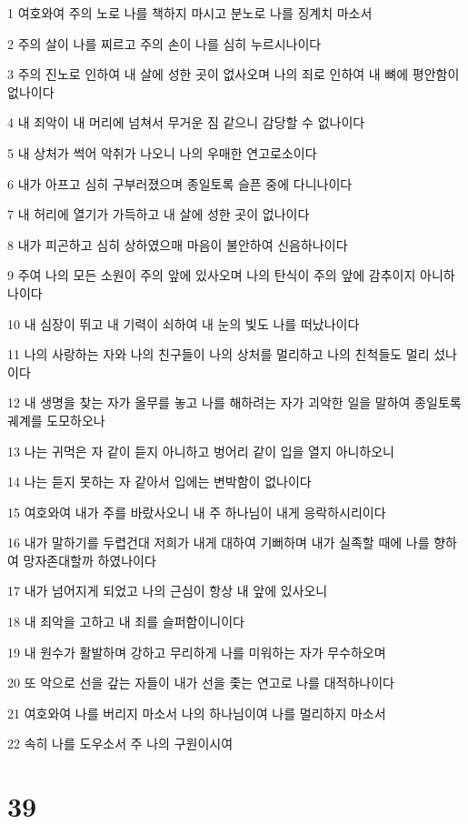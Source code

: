 \par 1 여호와여 주의 노로 나를 책하지 마시고 분노로 나를 징계치 마소서
\par 2 주의 살이 나를 찌르고 주의 손이 나를 심히 누르시나이다
\par 3 주의 진노로 인하여 내 살에 성한 곳이 없사오며 나의 죄로 인하여 내 뼈에 평안함이 없나이다
\par 4 내 죄악이 내 머리에 넘쳐서 무거운 짐 같으니 감당할 수 없나이다
\par 5 내 상처가 썩어 악취가 나오니 나의 우매한 연고로소이다
\par 6 내가 아프고 심히 구부러졌으며 종일토록 슬픈 중에 다니나이다
\par 7 내 허리에 열기가 가득하고 내 살에 성한 곳이 없나이다
\par 8 내가 피곤하고 심히 상하였으매 마음이 불안하여 신음하나이다
\par 9 주여 나의 모든 소원이 주의 앞에 있사오며 나의 탄식이 주의 앞에 감추이지 아니하나이다
\par 10 내 심장이 뛰고 내 기력이 쇠하여 내 눈의 빛도 나를 떠났나이다
\par 11 나의 사랑하는 자와 나의 친구들이 나의 상처를 멀리하고 나의 친척들도 멀리 섰나이다
\par 12 내 생명을 찾는 자가 올무를 놓고 나를 해하려는 자가 괴악한 일을 말하여 종일토록 궤계를 도모하오나
\par 13 나는 귀먹은 자 같이 듣지 아니하고 벙어리 같이 입을 열지 아니하오니
\par 14 나는 듣지 못하는 자 같아서 입에는 변박함이 없나이다
\par 15 여호와여 내가 주를 바랐사오니 내 주 하나님이 내게 응락하시리이다
\par 16 내가 말하기를 두렵건대 저희가 내게 대하여 기뻐하며 내가 실족할 때에 나를 향하여 망자존대할까 하였나이다
\par 17 내가 넘어지게 되었고 나의 근심이 항상 내 앞에 있사오니
\par 18 내 죄악을 고하고 내 죄를 슬퍼함이니이다
\par 19 내 원수가 활발하며 강하고 무리하게 나를 미워하는 자가 무수하오며
\par 20 또 악으로 선을 갚는 자들이 내가 선을 좇는 연고로 나를 대적하나이다
\par 21 여호와여 나를 버리지 마소서 나의 하나님이여 나를 멀리하지 마소서
\par 22 속히 나를 도우소서 주 나의 구원이시여

\chapter{39}

